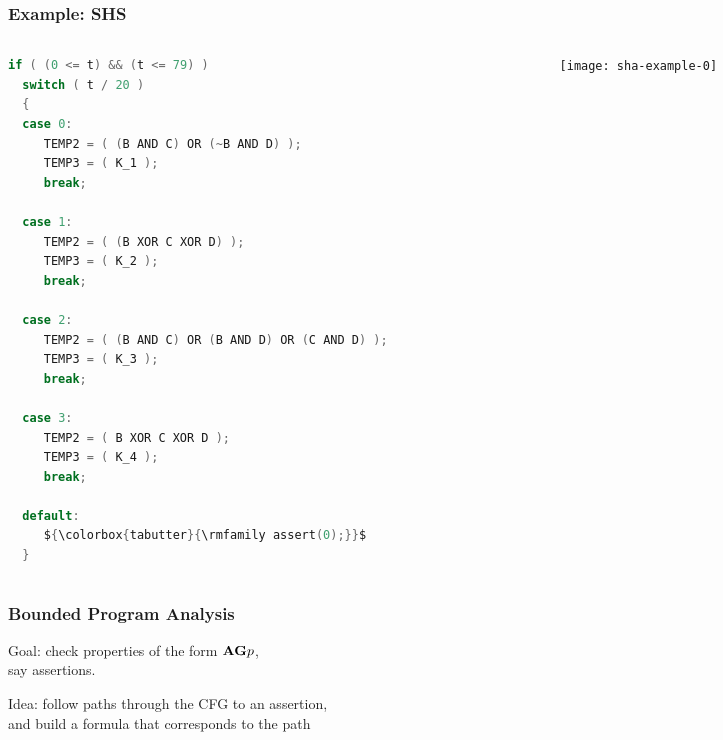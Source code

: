 
\lstset{language=C,basicstyle=\rmfamily\tiny,escapechar=\$,columns=flexible}

\begin{frame}[fragile]
\frametitle{Example: SHS}

\begin{columns}
\begin{column}{.7\textwidth}
\begin{lstlisting}[language=C,
basicstyle=\rmfamily\tiny,escapechar=\$,columns=flexible]
if ( (0 <= t) && (t <= 79) )
  switch ( t / 20 )
  {
  case 0:
     TEMP2 = ( (B AND C) OR (~B AND D) );
     TEMP3 = ( K_1 );
     break;

  case 1:
     TEMP2 = ( (B XOR C XOR D) );
     TEMP3 = ( K_2 );
     break;

  case 2:
     TEMP2 = ( (B AND C) OR (B AND D) OR (C AND D) );
     TEMP3 = ( K_3 );
     break;

  case 3:  
     TEMP2 = ( B XOR C XOR D );
     TEMP3 = ( K_4 );
     break;

  default: 
     ${\colorbox{tabutter}{\rmfamily assert(0);}}$
  }
\end{lstlisting}
\end{column}
\begin{column}{.3\textwidth}
\pause
\texttt{[image: sha-example-0]}
\end{column}
\end{columns}

\end{frame}


\begin{frame}
\frametitle{Bounded Program Analysis}

Goal: check properties of the form $\mathrm{\bf A}\mathrm{\bf G} p$,\\
say assertions.
\vfill

Idea: {\color{ta3skyblue}follow paths through the CFG} to an assertion,\\
and build a formula that corresponds to the path

\end{frame}

